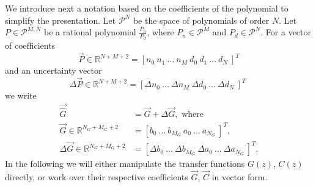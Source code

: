 \documentclass[final]{sig-alternate-05-2015}
\begin{document}
We introduce next a notation based on the coefficients of the polynomial to
simplify the presentation.  Let $\mathcal{P}^{N}$ be the space of
polynomials of order $N$.  Let $P \in \mathcal{P}^{M,N}$ be a rational
polynomial $\frac{P_n}{P_d}$, where $P_n \in \mathcal{P}^{M}$ and $P_d \in
\mathcal{P}^{N}$.  For a vector of coefficients
%
\begin{equation}
\vec{P} \in \mathbb{R}^{N+M+2}=[n_{0}\ n_{1}\ \hdots \ n_{M}\ d_{0}\ d_{1}\ \hdots\ d_{N}\ ]^T
\label{eq:coefficients}
\end{equation}
%
and an uncertainty vector 
%
\begin{equation}
\Delta{\vec{P}}\in \mathbb{R}^{N+M+2}=[\Delta{n}_{0}\ \hdots \ \Delta{n}_{M}\ \Delta{d}_{0}\ \hdots\ \Delta{d}_{N}\ ]^T \; 
\label{eq:delta_coefficients}
\end{equation}
%
we write
\begin{align}
\label{eq:hatgvector}
\vec{\hat{G}}&=\vec{G}+\Delta{\vec{G}}, \text{ where} \\
\vec{G} \in \mathbb{R}^{N_G+M_G+2}&=[b_{0}\ \hdots \ b_{M_G}\ a_{0}\ \hdots\ a_{N_G}\ ]^T, \nonumber \\
\Delta{\vec{G}}\in \mathbb{R}^{N_G+M_G+2}&=[\Delta{b}_{0}\ \hdots \ \Delta{b}_{M_G}\ \Delta{a}_{0}\ \hdots\ \Delta{a}_{N_G}\ ]^T. \nonumber
\end{align}
In the following we will either manipulate the transfer functions $G(z)$, $C(z)$ directly, 
or work over their respective coefficients $\vec{G}$, $\vec{C}$ in vector form.

\medskip
\end{document}
